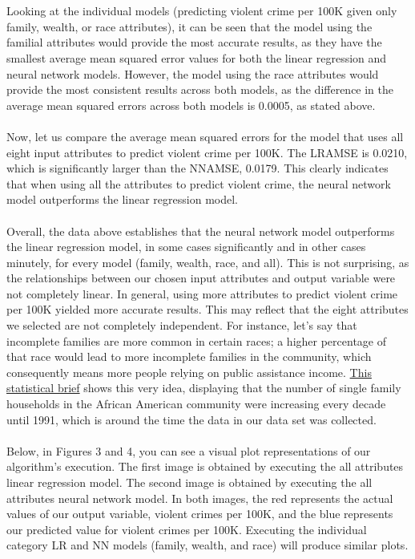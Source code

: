 \documentclass[letterpaper, 11 pt, conference]{article}
\begin{document}
\\
\\Looking at the individual models (predicting violent crime per 100K given only family, wealth, or race attributes), it can be seen that the model using the familial attributes would provide the most accurate results, as they have the smallest average mean squared error values for both the linear regression and neural network models. However, the model using the race attributes would provide the most consistent results across both models, as the difference in the average mean squared errors across both models is 0.0005, as stated above.
\\
\\Now, let us compare the average mean squared errors for the model that uses all eight input attributes to predict violent crime per 100K. The LRAMSE is 0.0210, which is significantly larger than the NNAMSE, 0.0179. This clearly indicates that when using all the attributes to predict violent crime, the neural network model outperforms the linear regression model.
\\
\\Overall, the data above establishes that the neural network model outperforms the linear regression model, in some cases significantly and in other cases minutely, for every model (family, wealth, race, and all). This is not surprising, as the relationships between our chosen input attributes and output variable were not completely linear. In general, using more attributes to predict violent crime per 100K yielded more accurate results. This may reflect that the eight attributes we selected are not completely independent. For instance, let's say that incomplete families are more common in certain races; a higher percentage of that race would lead to more incomplete families in the community, which consequently means more people relying on public assistance income. \href{https://www.census.gov/prod/1/statbrief/sb93_2.pdf} {This statistical brief} shows this very idea, displaying that the number of single family households in the African American community were increasing every decade until 1991, which is around the time the data in our data set was collected.
\\
\\Below, in Figures 3 and 4, you can see a visual plot representations of our algorithm's execution. The first image is obtained by executing the all attributes linear regression model. The second image is obtained by executing the all attributes neural network model. In both images, the red represents the actual values of our output variable, violent crimes per 100K, and the blue represents our predicted value for violent crimes per 100K. Executing the individual category LR and NN models (family, wealth, and race) will produce similar plots.
\end{document}
